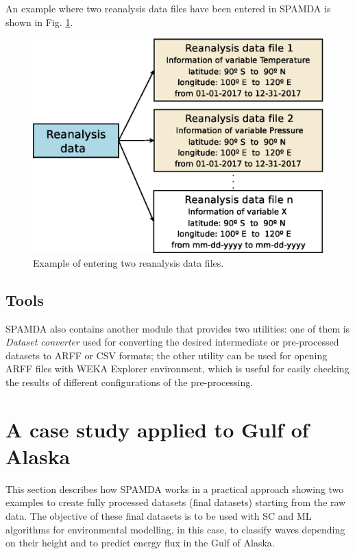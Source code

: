 \documentclass[energies,article,submit,moreauthors,pdftex]{Definitions/mdpi}
\begin{document}
				An example where two reanalysis data files have been entered in SPAMDA is shown in Fig. \ref{fig:manageReanalisys}.
				
				\begin{figure}[ht!]
					\centering
					\includegraphics[scale=0.45]{figures/FigureManageReanalisys.eps}
					\caption{Example of entering two reanalysis data files.}
					\label{fig:manageReanalisys}
				\end{figure}
				
			\subsection{Tools}
			
				SPAMDA also contains another module that provides two utilities: one of them is \textit{Dataset converter} used for converting the desired intermediate or pre-processed datasets to ARFF or CSV formats; the other utility can be used for opening ARFF files with WEKA Explorer environment, which is useful for easily checking the results of different configurations of the pre-processing.
				
	\section{A case study applied to Gulf of Alaska}\label{sec:CaseStudy}
		
		This section describes how SPAMDA works in a practical approach showing two examples to create fully processed datasets (final datasets) starting from the raw data. The objective of these final datasets is to be used with SC and ML algorithms for environmental modelling, in this case, to classify waves depending on their height and to predict energy flux in the Gulf of Alaska.
		
\end{document}
